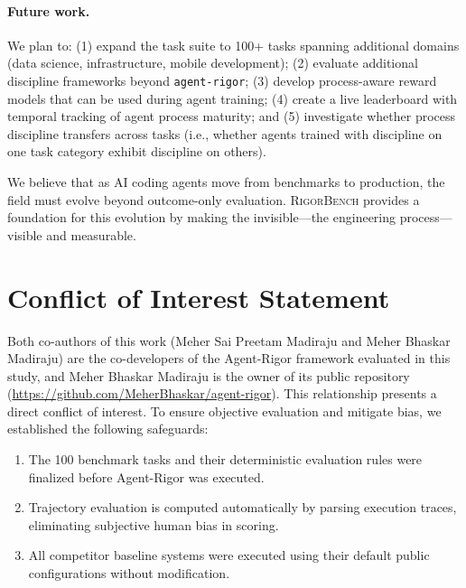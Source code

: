 \documentclass[letterpaper, 10 pt, conference]{ieeeconf}
\newcommand{\bench}{\textsc{RigorBench}}
\newcommand{\rigor}{\texttt{agent-rigor}}
\begin{document}
\paragraph{Future work.}
We plan to: (1) expand the task suite to 100+ tasks spanning additional domains (data science, infrastructure, mobile development); (2) evaluate additional discipline frameworks beyond \rigor{}; (3) develop process-aware reward models that can be used during agent training; (4) create a live leaderboard with temporal tracking of agent process maturity; and (5) investigate whether process discipline transfers across tasks (i.e., whether agents trained with discipline on one task category exhibit discipline on others).

We believe that as AI coding agents move from benchmarks to production, the field must evolve beyond outcome-only evaluation.
\bench{} provides a foundation for this evolution by making the invisible---the engineering process---visible and measurable.

\section*{Conflict of Interest Statement}
Both co-authors of this work (Meher Sai Preetam Madiraju and Meher Bhaskar Madiraju) are the co-developers of the Agent-Rigor framework evaluated in this study, and Meher Bhaskar Madiraju is the owner of its public repository (\url{https://github.com/MeherBhaskar/agent-rigor}). This relationship presents a direct conflict of interest. To ensure objective evaluation and mitigate bias, we established the following safeguards:
\begin{enumerate}[leftmargin=*]
  \item The 100 benchmark tasks and their deterministic evaluation rules were finalized before Agent-Rigor was executed.
  \item Trajectory evaluation is computed automatically by parsing execution traces, eliminating subjective human bias in scoring.
  \item All competitor baseline systems were executed using their default public configurations without modification.
\end{enumerate}
\end{document}

